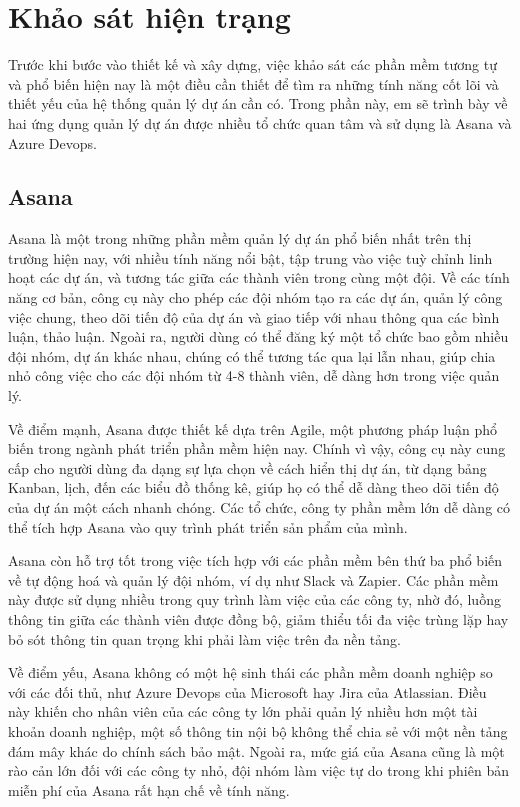 \documentclass[../DoAn.tex]{subfiles}
\begin{document}
\section{Khảo sát hiện trạng}
\label{section:2.1}
Trước khi bước vào thiết kế và xây dựng, việc khảo sát các phần mềm tương tự và phổ biến hiện nay là một điều cần thiết để tìm ra những tính năng cốt lõi
và thiết yếu của hệ thống quản lý dự án cần có. Trong phần này, em sẽ trình bày về hai ứng dụng quản lý dự án được nhiều tổ chức quan tâm và sử dụng là Asana và Azure Devops.

\label{subsection:2.1.1}
\subsection{Asana}
Asana là một trong những phần mềm quản lý dự án phổ biến nhất trên thị trường hiện nay, với nhiều tính năng nổi bật, tập trung vào việc tuỳ chỉnh linh hoạt các dự án, và tương tác giữa các thành viên trong cùng một đội. Về các tính năng cơ bản, công cụ này cho phép các đội nhóm tạo ra các dự án,
quản lý công việc chung, theo dõi tiến độ của dự án và giao tiếp với nhau thông qua các bình luận, thảo luận. Ngoài ra, người dùng có thể đăng ký một tổ chức bao gồm nhiều
đội nhóm, dự án khác nhau, chúng có thể tương tác qua lại lẫn nhau, giúp chia nhỏ công việc cho các đội nhóm từ 4-8 thành viên, dễ dàng hơn trong việc quản lý.

Về điểm mạnh, Asana được thiết kế dựa trên Agile, một phương pháp luận phổ biến trong ngành phát triển phần mềm hiện nay. Chính vì vậy, công cụ này cung cấp cho người dùng
đa dạng sự lựa chọn về cách hiển thị dự án, từ dạng bảng Kanban, lịch, đến các biểu đồ thống kê, giúp họ có thể dễ dàng theo dõi tiến độ của dự án một cách nhanh chóng.
Các tổ chức, công ty phần mềm lớn dễ dàng có thể tích hợp Asana vào quy trình phát triển sản phẩm của mình.

Asana còn hỗ trợ tốt trong việc tích hợp với các phần mềm bên thứ ba phổ biến về tự động hoá và quản lý đội nhóm, ví dụ như Slack và Zapier. Các phần mềm này được sử dụng nhiều
trong quy trình làm việc của các công ty, nhờ đó, luồng thông tin giữa các thành viên được đồng bộ, giảm thiểu tối đa việc trùng lặp hay bỏ sót thông tin quan trọng khi phải
làm việc trên đa nền tảng.

Về điểm yếu, Asana không có một hệ sinh thái các phần mềm doanh nghiệp so với các đối thủ, như Azure Devops của Microsoft hay Jira của Atlassian.
Điều này khiến cho nhân viên của các công ty lớn phải quản lý nhiều hơn một tài khoản doanh nghiệp, một số thông tin nội bộ không thể chia sẻ với một nền tảng đám mây khác
do chính sách bảo mật. Ngoài ra, mức giá của Asana cũng là một rào cản lớn đối với các công ty nhỏ, đội nhóm làm việc tự do trong khi phiên bản miễn phí của Asana rất
hạn chế về tính năng.
\end{document}
